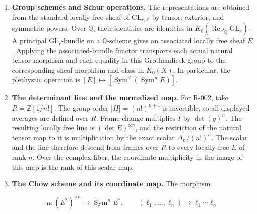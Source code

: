 \documentclass[
  10pt,
]{article}
\begin{document}
\begin{enumerate}
\def\labelenumi{\arabic{enumi}.}
\item
  \textbf{Group schemes and Schur operations.} The representations are
  obtained from the standard locally free sheaf of
  \(\mathrm{GL}_{r,\mathbb Z}\) by tensor, exterior, and symmetric
  powers. Over \(\mathbb Q\), their identities are identities in
  \(K_0(\operatorname{Rep}_{\mathbb Q}\mathrm{GL}_r)\). A principal
  \(\mathrm{GL}_r\)-bundle on a \(\mathbb Q\)-scheme gives an associated
  locally free sheaf \(E\). Applying the associated-bundle functor
  transports each actual natural tensor morphism and each equality in
  this Grothendieck group to the corresponding sheaf morphism and class
  in \(K_0(X)\). In particular, the plethystic operation is
  \([E]\mapsto[\operatorname{Sym}^d(\operatorname{Sym}^nE)]\).
\item
  \textbf{The determinant line and the normalized map.} For R-002, take
  \(R=\mathbb Z[1/n!]\). The group order \(|H|=(n!)^{n+1}\) is
  invertible, so all displayed averages are defined over \(R\). Frame
  change multiplies \(I\) by \(\det(g)^n\). The resulting locally free
  line is \((\det E)^{\otimes n}\), and the restriction of the natural
  tensor map to it is multiplication by the exact scalar
  \(\Delta_n/(n!)^n\). The scalar and the line therefore descend from
  frames over \(R\) to every locally free \(E\) of rank \(n\). Over the
  complex fiber, the coordinate multiplicity in the image of this map is
  the rank of this scalar map.
\item
  \textbf{The Chow scheme and its coordinate map.} The morphism

  \[
  \mu:(E^*)^{\times n}\longrightarrow\operatorname{Sym}^n E^*,
  \qquad(\ell_1,\ldots,\ell_n)\longmapsto\ell_1\cdots\ell_n
  \]


\end{enumerate}
\end{document}
